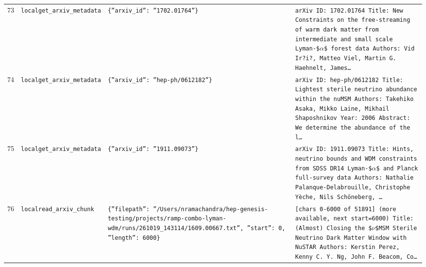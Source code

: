 \documentclass[11pt,a4paper]{article}
\begin{document}
\begin{longtable}{@{}p{}p{}p{}p{}@{}}
73 & \texttt{local}\newline\texttt{get\_\allowbreak{}arxiv\_\allowbreak{}metadata} & \texttt{\{''arxiv\_\allowbreak{}id'':\allowbreak{} ''1702.01764''\}\allowbreak{}} & \texttt{arXiv ID:\allowbreak{} 1702.01764 Title:\allowbreak{} New Constraints on the free-streaming of warm dark matter from intermediate and small scale Lyman-\$$\alpha$\$ forest data Authors:\allowbreak{} Vid Ir?i?,\allowbreak{} Matteo Viel,\allowbreak{} Martin G. Haehnelt,\allowbreak{} James\ldots{}\allowbreak{}} \\
74 & \texttt{local}\newline\texttt{get\_\allowbreak{}arxiv\_\allowbreak{}metadata} & \texttt{\{''arxiv\_\allowbreak{}id'':\allowbreak{} ''hep-ph/\allowbreak{}0612182''\}\allowbreak{}} & \texttt{arXiv ID:\allowbreak{} hep-ph/\allowbreak{}0612182 Title:\allowbreak{} Lightest sterile neutrino abundance within the nuMSM Authors:\allowbreak{} Takehiko Asaka,\allowbreak{} Mikko Laine,\allowbreak{} Mikhail Shaposhnikov Year:\allowbreak{} 2006 Abstract:\allowbreak{} We determine the abundance of the l\ldots{}\allowbreak{}} \\
75 & \texttt{local}\newline\texttt{get\_\allowbreak{}arxiv\_\allowbreak{}metadata} & \texttt{\{''arxiv\_\allowbreak{}id'':\allowbreak{} ''1911.09073''\}\allowbreak{}} & \texttt{arXiv ID:\allowbreak{} 1911.09073 Title:\allowbreak{} Hints,\allowbreak{} neutrino bounds and WDM constraints from SDSS DR14 Lyman-\$$\alpha$\$ and Planck full-survey data Authors:\allowbreak{} Nathalie Palanque-Delabrouille,\allowbreak{} Christophe Yèche,\allowbreak{} Nils Schöneberg,\allowbreak{} \ldots{}\allowbreak{}} \\
76 & \texttt{local}\newline\texttt{read\_\allowbreak{}arxiv\_\allowbreak{}chunk} & \texttt{\{''filepath'':\allowbreak{} ''/\allowbreak{}Users/\allowbreak{}nramachandra/\allowbreak{}hep-genesis-testing/\allowbreak{}projects/\allowbreak{}ramp-combo-lyman-wdm/\allowbreak{}runs/\allowbreak{}261019\_\allowbreak{}143114/\allowbreak{}1609.00667.txt'',\allowbreak{} ''start'':\allowbreak{} 0,\allowbreak{} ''length'':\allowbreak{} 6000\}\allowbreak{}} & \texttt{[chars 0-6000 of 51891]\allowbreak{} (more available,\allowbreak{} next start=\allowbreak{}6000)\allowbreak{}  Title:\allowbreak{} (Almost)\allowbreak{} Closing the \$$\nu$\$MSM Sterile Neutrino Dark Matter Window with NuSTAR Authors:\allowbreak{} Kerstin Perez,\allowbreak{} Kenny C. Y. Ng,\allowbreak{} John F. Beacom,\allowbreak{} Co\ldots{}\allowbreak{}} \\

\end{longtable}
\end{document}
